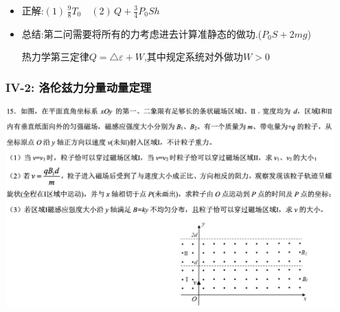 \documentclass{article}
\begin{document}
\begin{itemize}
    \item 正解:\quad $(1) \, \frac{9}{8} T_{0} \quad (2) \,Q+\frac{3}{4} P_{0} S h $
    \item 总结:\quad 第二问需要将所有的力考虑进去计算准静态的做功.($P_{0}S + 2mg $)

          \hspace{3.2em}热力学第三定律$Q = \triangle \varepsilon + W$,其中规定系统对外做功$W>0$
\end{itemize}

\vspace{2em}

\subsubsection{IV-2: 洛伦兹力分量动量定理}
\includegraphics[width=0.95\textwidth,keepaspectratio]{./pictures/3.11-5.png}
\end{document}
